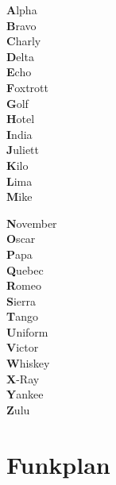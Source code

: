 \documentclass[a4paper,10pt]{article}
\begin{document}
\begin{minipage}[t]{0.5\textwidth}
  \large
  \textbf{A}lpha\\
  \textbf{B}ravo\\
  \textbf{C}harly\\
  \textbf{D}elta\\
  \textbf{E}cho\\
  \textbf{F}oxtrott\\
  \textbf{G}olf\\
  \textbf{H}otel\\
  \textbf{I}ndia\\
  \textbf{J}uliett\\
  \textbf{K}ilo\\
  \textbf{L}ima\\
  \textbf{M}ike\\
\end{minipage}
\begin{minipage}[t]{0.5\textwidth}
  \large
  \textbf{N}ovember\\
  \textbf{O}scar\\
  \textbf{P}apa\\
  \textbf{Q}uebec\\
  \textbf{R}omeo\\
  \textbf{S}ierra\\
  \textbf{T}ango\\
  \textbf{U}niform\\
  \textbf{V}ictor\\
  \textbf{W}hiskey\\
  \textbf{X}-Ray\\
  \textbf{Y}ankee\\
  \textbf{Z}ulu\\
\end{minipage}

\clearpage

\section{Funkplan}
\end{document}
